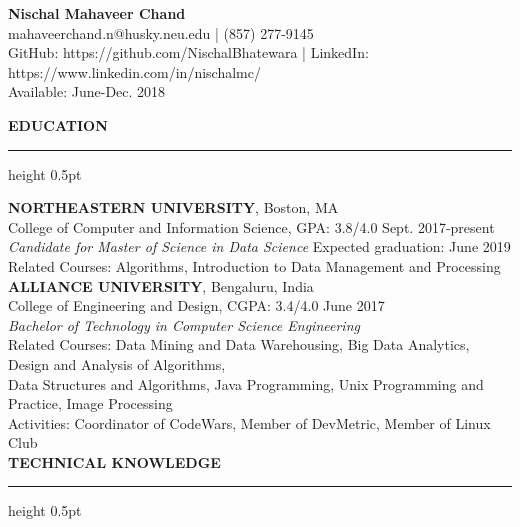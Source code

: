 \documentclass[a4paper]{article}
\newcommand{\myline}{\par
  \kern2pt %
  \hrule height 0.5pt
  \kern2pt %
}
\begin{document}
	\begin{center}
		{\Large \textbf{Nischal Mahaveer Chand}} \\
		mahaveerchand.n@husky.neu.edu | (857) 277-9145 \\
                GitHub: https://github.com/NischalBhatewara | 
                LinkedIn: https://www.linkedin.com/in/nischalmc/\\
		Available: June-Dec. 2018 \\
	\end{center}
	
	\noindent
	{\large \textbf{EDUCATION}}
	\myline 
	\smallskip
	
	\noindent
	\textbf{NORTHEASTERN UNIVERSITY}, Boston, MA \\
	\indent College of Computer and Information Science, GPA: 3.8/4.0 
        \hfill Sept. 2017-present \\
	\indent \textit{Candidate for Master of Science in Data Science} 
        \hfill Expected graduation: June 2019 \\
	\indent Related Courses: Algorithms, Introduction to Data Management and Processing \\
	
	\noindent
	\textbf{ALLIANCE UNIVERSITY}, Bengaluru, India \\
	\indent College of Engineering and Design, CGPA: 3.4/4.0 \hfill June 2017 \\
	\indent \textit{Bachelor of Technology in Computer Science Engineering} \\
	\indent Related Courses: 
                                    Data Mining and Data Warehousing,
                                    Big Data Analytics, 
                                    Design and Analysis of Algorithms, 
                                    \\ \hspace*{29.3mm}
                                    Data Structures and Algorithms, 
                                    Java Programming, 
                                    Unix Programming and Practice, 
                                    Image Processing
                                    \\
	\indent Activities: Coordinator of CodeWars, Member of DevMetric, Member of Linux 
        Club \\
	
	\noindent
	{\large \textbf{TECHNICAL KNOWLEDGE}}
	\myline 
	
\end{document}
